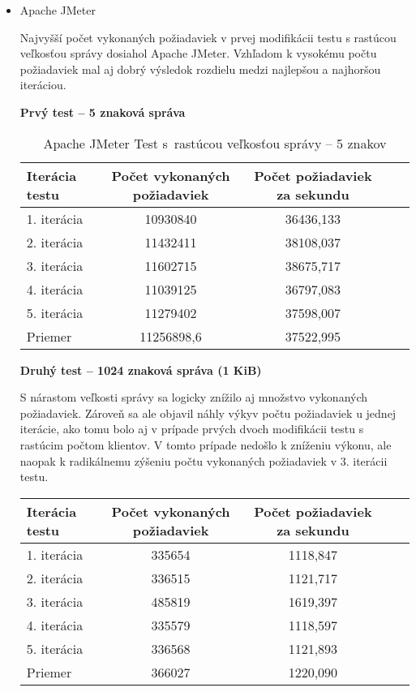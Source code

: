 \documentclass[12pt,oneside,final]{fithesis-utf8}
\begin{document}
\begin{itemize}

\item Apache JMeter

Najvyšší počet vykonaných požiadaviek v prvej modifikácii testu s rastúcou veľkosťou správy dosiahol Apache JMeter. Vzhľadom k vysokému počtu požiadaviek mal aj dobrý výsledok rozdielu medzi najlepšou a najhoršou iteráciou.

\textbf{Prvý test -- 5 znaková správa}

\begin{table}[H]
\begin{center}
\begin{tabular}{ | l | c | c | c | c |}
		\hline
		 \textbf{Iterácia testu} & \textbf{Počet vykonaných požiadaviek} & \textbf{Počet požiadaviek za sekundu} \\ \hline
		 1. iterácia & 10930840 & 36436,133 \\ \hline
		 2. iterácia & 11432411 & 38108,037 \\ \hline
		 3. iterácia & 11602715 & 38675,717 \\ \hline
		 4. iterácia & 11039125 & 36797,083 \\ \hline
		 5. iterácia & 11279402 & 37598,007 \\ \hline
		 Priemer & 11256898,6 & 37522,995 \\ \hline
		 
\end{tabular}
\end{center}
\caption{Apache JMeter Test s~rastúcou veľkosťou správy -- 5 znakov}
\end{table}


\textbf{Druhý test -- 1024 znaková správa (1 KiB)}

S nárastom veľkosti správy sa logicky znížilo aj množstvo vykonaných požiadaviek. Zároveň sa ale objavil náhly výkyv počtu požiadaviek u jednej iterácie, ako tomu bolo aj v prípade prvých dvoch modifikácii testu s rastúcim počtom klientov. V tomto prípade nedošlo k zníženiu výkonu, ale naopak k radikálnemu zýšeniu počtu vykonaných požiadaviek v 3. iterácii testu.

\begin{table}[H]
\begin{center}
\begin{tabular}{ | l | c | c | c | c |}
		\hline
		 \textbf{Iterácia testu} & \textbf{Počet vykonaných požiadaviek} & \textbf{Počet požiadaviek za sekundu} \\ \hline
		 1. iterácia & 335654 & 1118,847 \\ \hline
		 2. iterácia & 336515 & 1121,717 \\ \hline
		 3. iterácia & 485819 & 1619,397 \\ \hline
		 4. iterácia & 335579 & 1118,597 \\ \hline
		 5. iterácia & 336568 & 1121,893 \\ \hline
		 Priemer & 366027 & 1220,090 \\ \hline
		 

\end{tabular}
\end{center}
\end{table}
\end{itemize}
\end{document}
